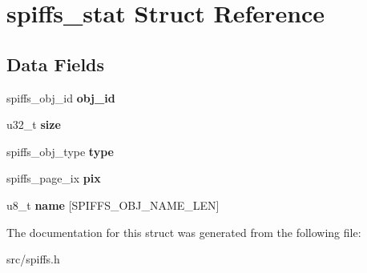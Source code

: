 \hypertarget{structspiffs__stat}{}\section{spiffs\+\_\+stat Struct Reference}
\label{structspiffs__stat}
\subsection*{Data Fields}
\begin{DoxyCompactItemize}
\item 
\mbox{\label{structspiffs__stat_a50f7d3e286b659e09498edf4e17f1daf}} 
spiffs\+\_\+obj\+\_\+id {\bfseries obj\+\_\+id}
\item 
\mbox{\label{structspiffs__stat_a861b9a64014f77a01b9630278a7c2410}} 
u32\+\_\+t {\bfseries size}
\item 
\mbox{\label{structspiffs__stat_ae08c958bb4b22fd9c6d576e1fea23685}} 
spiffs\+\_\+obj\+\_\+type {\bfseries type}
\item 
\mbox{\label{structspiffs__stat_a06f9e575229aee0252974423e045fe50}} 
spiffs\+\_\+page\+\_\+ix {\bfseries pix}
\item 
\mbox{\label{structspiffs__stat_a42b32d4cd1868c63f8a8598e5d888a8b}} 
u8\+\_\+t {\bfseries name} \mbox{[}S\+P\+I\+F\+F\+S\+\_\+\+O\+B\+J\+\_\+\+N\+A\+M\+E\+\_\+\+L\+EN\mbox{]}
\end{DoxyCompactItemize}


The documentation for this struct was generated from the following file\+:\begin{DoxyCompactItemize}
\item 
src/spiffs.\+h\end{DoxyCompactItemize}
